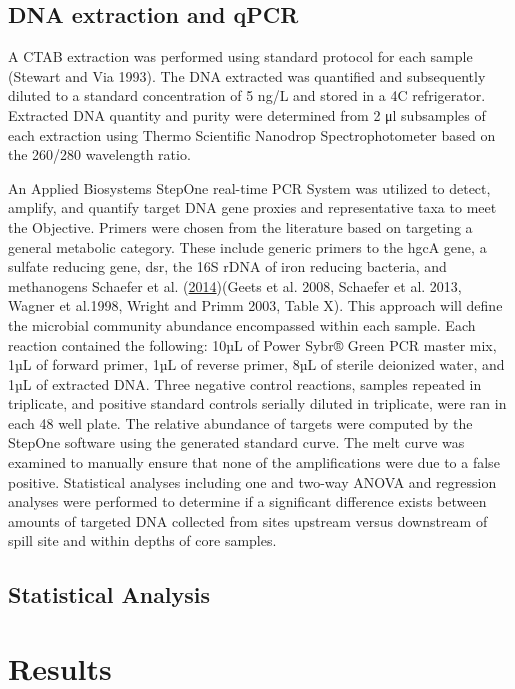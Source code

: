 \documentclass[ms]{uncgdissertationexp}
\theoremstyle{plain}
\theoremstyle{definition}
\theoremstyle{remark}
\begin{document}
  \subsection{DNA extraction and qPCR}\label{dna-extraction-and-qpcr}
  
  A CTAB extraction was performed using standard protocol for each sample
  (Stewart and Via 1993). The DNA extracted was quantified and
  subsequently diluted to a standard concentration of 5 ng/L and stored in
  a 4C refrigerator. Extracted DNA quantity and purity were determined
  from 2 μl subsamples of each extraction using Thermo Scientific Nanodrop
  Spectrophotometer based on the 260/280 wavelength ratio.
  
  An Applied Biosystems StepOne real-time PCR System was utilized to
  detect, amplify, and quantify target DNA gene proxies and representative
  taxa to meet the Objective. Primers were chosen from the literature
  based on targeting a general metabolic category. These include generic
  primers to the hgcA gene, a sulfate reducing gene, dsr, the 16S rDNA of
  iron reducing bacteria, and methanogens Schaefer et al.
  (\protect\hyperlink{ref-schaeferDetectionKeyHg2014}{2014})(Geets et al.
  2008, Schaefer et al. 2013, Wagner et al.1998, Wright and Primm 2003,
  Table X). This approach will define the microbial community abundance
  encompassed within each sample. Each reaction contained the following:
  10µL of Power Sybr® Green PCR master mix, 1µL of forward primer, 1µL of
  reverse primer, 8µL of sterile deionized water, and 1µL of extracted
  DNA. Three negative control reactions, samples repeated in triplicate,
  and positive standard controls serially diluted in triplicate, were ran
  in each 48 well plate. The relative abundance of targets were computed
  by the StepOne software using the generated standard curve. The melt
  curve was examined to manually ensure that none of the amplifications
  were due to a false positive. Statistical analyses including one and
  two-way ANOVA and regression analyses were performed to determine if a
  significant difference exists between amounts of targeted DNA collected
  from sites upstream versus downstream of spill site and within depths of
  core samples.
  
  \subsection{Statistical Analysis}\label{statistical-analysis}
  
  \section{Results}\label{results}
  
\end{document}
